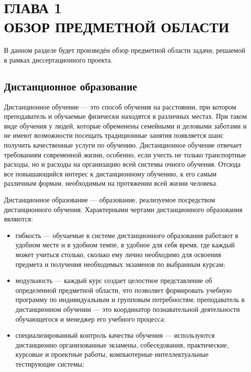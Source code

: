 \section*{ГЛАВА 1\\ ОБЗОР ПРЕДМЕТНОЙ ОБЛАСТИ}
\setcounter{section}{1}

В данном разделе будет произведён обзор предметной области задачи,
решаемой в рамках диссертационного проекта.

\subsection{Дистанционное образование}

Дистанционное обучение — это способ обучения на расстоянии, при котором преподаватель и
обучаемые физически находятся в различных местах. При таком виде обучения у людей, которые
обременены семейными и деловыми заботами и не имеют возможности посещать традиционные занятия
появляется шанс получить качественные услуги по обучению. Дистанционное обучение отвечает
требованиям современной жизни, особенно, если учесть не только транспортные расходы, но и
расходы на организацию всей системы очного обучения. Отсюда все повышающийся интерес к
дистанционному обучению, к его самым различным формам, необходимым на протяжении
всей жизни человека.\cite{moluch}

Дистанционное образование — образование, реализуемое посредством дистанционного обучения.
Характерными чертами дистанционного образования являются:
\begin{itemize}[wide,topsep=0pt]
  \itemsep0em
  \item гибкость — обучаемые в системе дистанционного образования работают в удобном месте и в удобном темпе,
  в удобное для себя время, где каждый может учиться столько, сколько ему лично необходимо для
  освоения предмета и получения необходимых экзаменов по выбранным курсам;
  \item модульность — каждый курс создает целостное представление об определенной предметной области,
  что позволяет формировать учебную программу по индивидуальным и групповым потребностям; преподаватель в дистанционном обучении — это координатор познавательной деятельности
  обучающегося и менеджер его учебного процесса;
  \item специализированный контроль качества обучения —
  используются дистанционно организованные экзамены, собеседования, практические, курсовые и
  проектные работы, компьютерные интеллектуальные тестирующие системы;
\end{itemize}

